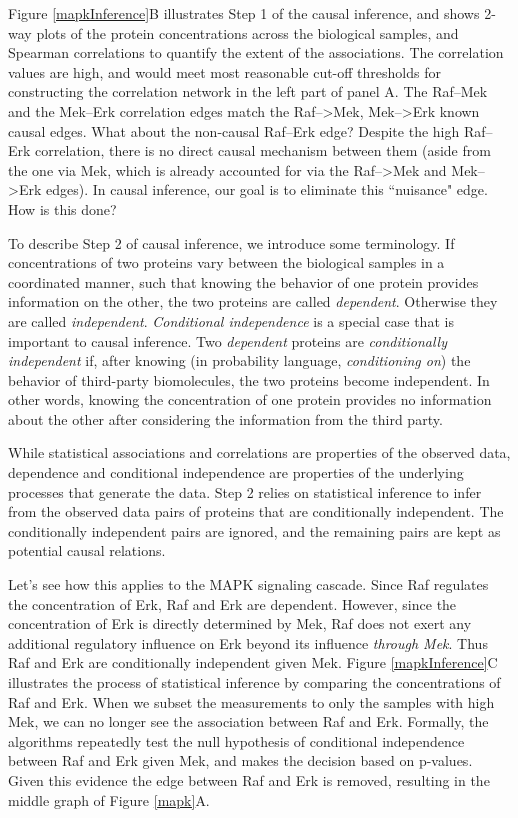 \documentclass[journal=jacsat,manuscript=article]{achemso}
\def\added#1{{\color{blue} #1}}
\begin{document}
Figure \ref{mapkInference}B illustrates Step 1 of the causal inference, and shows 2-way plots of the protein concentrations across the biological samples, and Spearman correlations to quantify the extent of the associations.  The correlation values are high, and would meet most reasonable cut-off thresholds for constructing the correlation network in the left part of panel A.  The Raf--Mek and the Mek--Erk correlation edges match the Raf-->Mek, Mek-->Erk known causal edges.  What about the non-causal Raf--Erk edge? Despite the high Raf--Erk correlation, there is no direct causal mechanism between them (aside from the one via Mek, which is already accounted for via the Raf-->Mek and Mek-->Erk edges).  In causal  inference, our goal is to eliminate this ``nuisance" edge.  How is this done?

\added{To describe Step 2 of causal inference, we introduce some terminology. If concentrations of two proteins vary between the biological samples in a coordinated manner, such that knowing the behavior of one protein provides information on the other, the two proteins are called {\it dependent}. Otherwise they are called {\it independent}. {\it Conditional independence} is a special case that is important to causal inference.  Two {\it dependent} proteins are {\it conditionally independent} if, after knowing (in probability language, {\it conditioning on}) the behavior of third-party biomolecules, the two proteins become independent. In other words, knowing the concentration of one protein provides no information about the other after considering the information from the third party.} 


\added{While statistical associations and correlations are properties of the observed data, dependence and conditional independence are properties of the underlying processes that generate the data. Step 2 relies on statistical inference\cite{pearl2009causality} to infer from the observed data pairs of proteins that are conditionally independent. The conditionally independent pairs are ignored, and the remaining pairs are kept as potential causal relations.}

Let's see how this applies to the MAPK signaling cascade. \added{Since Raf regulates the concentration of Erk, Raf and Erk are dependent.  However, since the concentration of Erk is directly determined by Mek, Raf does not exert any additional regulatory influence on Erk beyond its influence {\it through Mek}.  Thus Raf and Erk are conditionally independent given Mek.  }  Figure \ref{mapkInference}C illustrates the process of statistical inference by comparing the concentrations of Raf and Erk. When we subset the measurements to only the samples with high Mek, we can no longer see the association between Raf and Erk. Formally, the algorithms repeatedly test the null hypothesis of conditional independence between Raf and Erk given Mek, and makes the decision based on p-values\cite{spirtes2000causation}. Given this evidence the edge between Raf and Erk is removed, resulting in the middle graph of Figure \ref{mapk}A. 
\end{document}
